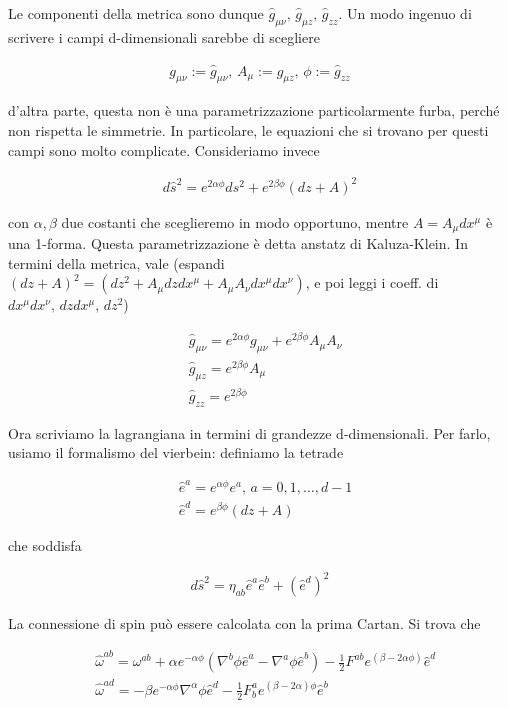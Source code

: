 \documentclass{report}
\begin{document}
Le componenti della metrica sono dunque \(\hat{g}_{\mu\nu}, \, \hat{g}_{\mu z}, \, \hat{g}_{zz}\). Un modo ingenuo di scrivere i campi d-dimensionali sarebbe di scegliere 

\begin{align}
    g_{\mu\nu} := \hat{g}_{\mu\nu}, \, A_\mu := \hat{g}_{\mu z}, \, \phi := \hat{g}_{zz}
\end{align}

d'altra parte, questa non è una parametrizzazione particolarmente furba, perché non rispetta le simmetrie. In particolare, le equazioni che si trovano per questi campi sono molto complicate. Consideriamo invece 

\begin{align}
    d\hat{s}^2 = e^{2\alpha \phi}ds^2 + e^{2\beta\phi}(dz + A)^2
\end{align}

con \(\alpha, \beta\) due costanti che sceglieremo in modo opportuno, mentre \(A = A_\mu dx^\mu\) è una 1-forma. Questa parametrizzazione è detta anstatz di Kaluza-Klein. In termini della metrica, vale (espandi \((dz+A)^2 = (dz^2 + A_\mu dz dx^\mu + A_\mu A_\nu dx^\mu dx^\nu)\), e poi leggi i coeff. di \(dx^\mu dx^\nu, \, dzdx^\mu, \, dz^2\)) 

\begin{align}
    &\hat{g}_{\mu\nu} = e^{2\alpha\phi}g_{\mu\nu} + e^{2\beta\phi}A_\mu A_\nu \\
    &\hat{g}_{\mu z} = e^{2\beta\phi}A_{\mu} \\
    &\hat{g}_{zz} = e^{2\beta\phi}
\end{align}

Ora scriviamo la lagrangiana in termini di grandezze d-dimensionali. Per farlo, usiamo il formalismo del vierbein: definiamo la tetrade 

\begin{align}
    &\hat{e}^a = e^{\alpha \phi}e^a, \, a = 0, 1, \ldots, d-1 \\
    &\hat{e}^d = e^{\beta\phi}(dz +A)
\end{align}

che soddisfa 

\begin{align}
    d\hat{s}^2 = \eta_{ab}\hat{e}^a\hat{e}^b + (\hat{e}^d)^2
\end{align}

La connessione di spin può essere calcolata con la prima Cartan. Si trova che 

\begin{align}
    &\hat{\omega}^{ab} = \omega^{ab} + \alpha e^{-\alpha\phi}(\nabla^b\phi \hat{e}^a - \nabla^a \phi \hat{e}^b) - \frac{1}{2}F^{ab}e^{(\beta -2\alpha\phi)} \hat{e}^d \\
    &\hat{\omega}^{ad} = -\beta e^{-\alpha\phi}\nabla^\alpha \phi \hat{e}^d - \frac{1}{2}F^a_b e^{(\beta-2\alpha)\phi}\hat{e}^b
\end{align}
\end{document}
